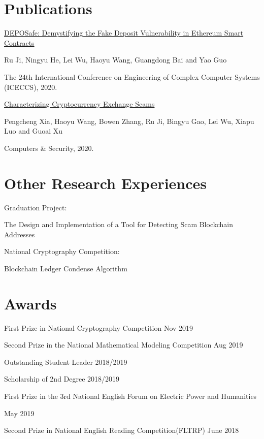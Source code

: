 \documentclass{article}
\begin{document}
\section{Publications}
\ralewaysb  \href{https://arxiv.org/pdf/2006.06419.pdf}{DEPOSafe: Demystifying the Fake Deposit Vulnerability in Ethereum Smart Contracts} 

\raleway

Ru Ji, Ningyu He, Lei Wu, Haoyu Wang, Guangdong Bai and Yao Guo

The 24th International Conference on Engineering of Complex Computer Systems (ICECCS), 2020.



\ralewaysb  \href{https://arxiv.org/pdf/2003.07314.pdf}{Characterizing Cryptocurrency Exchange Scams}\raleway

Pengcheng Xia, Haoyu Wang, Bowen Zhang, Ru Ji, Bingyu Gao, Lei Wu, Xiapu Luo and Guoai Xu

Computers \& Security, 2020.


\section{Other Research Experiences}


\ralewaysb Graduation Project:

\raleway The Design and Implementation of a Tool for Detecting Scam Blockchain Addresses


\ralewaysb National Cryptography Competition:

\raleway Blockchain Ledger Condense Algorithm



\section{Awards}


\ralewaysb First Prize in National Cryptography Competition \raleway \hfill Nov 2019

\ralewaysb Second Prize in the National Mathematical Modeling Competition \raleway\hfill Aug 2019

\ralewaysb Outstanding Student Leader \raleway\hfill 2018/2019

\ralewaysb Scholarship of 2nd Degree \raleway\hfill 2018/2019

\ralewaysb First Prize in the 3rd National English Forum on Electric Power and Humanities \raleway

 \hfill May 2019

\ralewaysb Second Prize in National English Reading Competition(FLTRP) \raleway \hfill June 2018
\end{document}
